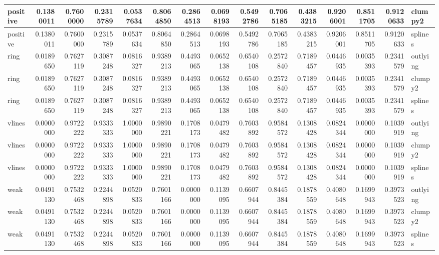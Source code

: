 \begin{Schunk}
\begin{tabular}{l|r|r|r|r|r|r|r|r|r|r|r|r|r|l}
\hline
positive & 0.1380011 & 0.7600000 & 0.2315789 & 0.0537634 & 0.8064850 & 0.2864513 & 0.0698193 & 0.5492786 & 0.7065185 & 0.4383215 & 0.9206001 & 0.8511705 & 0.9120633 & clumpy2\\
\hline
positive & 0.1380011 & 0.7600000 & 0.2315789 & 0.0537634 & 0.8064850 & 0.2864513 & 0.0698193 & 0.5492786 & 0.7065185 & 0.4383215 & 0.9206001 & 0.8511705 & 0.9120633 & splines\\
\hline
ring & 0.0189650 & 0.7627119 & 0.3087248 & 0.0816327 & 0.9389213 & 0.4493065 & 0.0652138 & 0.6540108 & 0.2572840 & 0.7189457 & 0.0446935 & 0.0035393 & 0.2341579 & outlying\\
\hline
ring & 0.0189650 & 0.7627119 & 0.3087248 & 0.0816327 & 0.9389213 & 0.4493065 & 0.0652138 & 0.6540108 & 0.2572840 & 0.7189457 & 0.0446935 & 0.0035393 & 0.2341579 & clumpy2\\
\hline
ring & 0.0189650 & 0.7627119 & 0.3087248 & 0.0816327 & 0.9389213 & 0.4493065 & 0.0652138 & 0.6540108 & 0.2572840 & 0.7189457 & 0.0446935 & 0.0035393 & 0.2341579 & splines\\
\hline
vlines & 0.0000000 & 0.9722222 & 0.9333333 & 1.0000000 & 0.9890221 & 0.1708173 & 0.0479482 & 0.7603892 & 0.9584572 & 0.1308428 & 0.0824344 & 0.0000000 & 0.1039919 & outlying\\
\hline
vlines & 0.0000000 & 0.9722222 & 0.9333333 & 1.0000000 & 0.9890221 & 0.1708173 & 0.0479482 & 0.7603892 & 0.9584572 & 0.1308428 & 0.0824344 & 0.0000000 & 0.1039919 & clumpy2\\
\hline
vlines & 0.0000000 & 0.9722222 & 0.9333333 & 1.0000000 & 0.9890221 & 0.1708173 & 0.0479482 & 0.7603892 & 0.9584572 & 0.1308428 & 0.0824344 & 0.0000000 & 0.1039919 & splines\\
\hline
weak & 0.0491130 & 0.7532468 & 0.2244898 & 0.0520833 & 0.7601166 & 0.0000000 & 0.1139095 & 0.6607944 & 0.8445384 & 0.1878559 & 0.4080648 & 0.1699943 & 0.3973523 & outlying\\
\hline
weak & 0.0491130 & 0.7532468 & 0.2244898 & 0.0520833 & 0.7601166 & 0.0000000 & 0.1139095 & 0.6607944 & 0.8445384 & 0.1878559 & 0.4080648 & 0.1699943 & 0.3973523 & clumpy2\\
\hline
weak & 0.0491130 & 0.7532468 & 0.2244898 & 0.0520833 & 0.7601166 & 0.0000000 & 0.1139095 & 0.6607944 & 0.8445384 & 0.1878559 & 0.4080648 & 0.1699943 & 0.3973523 & splines\\
\hline
\end{tabular}

\end{Schunk}

